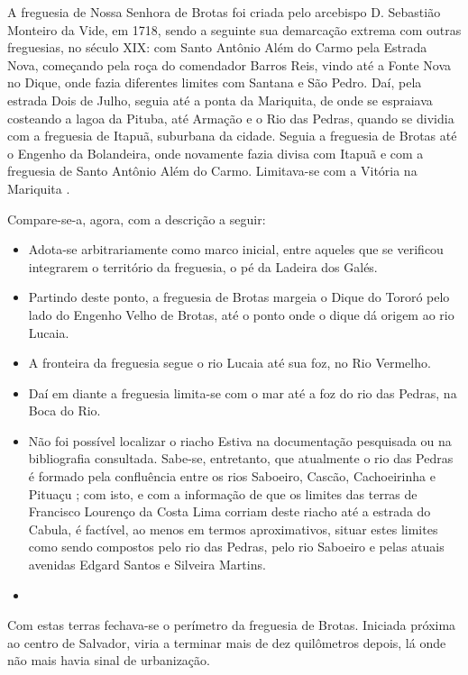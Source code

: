 \begin{citacao}
\begin{citacao}
A freguesia de Nossa Senhora de Brotas foi criada pelo arcebispo D. Sebastião Monteiro da Vide, em 1718, sendo a seguinte sua demarcação extrema com outras freguesias, no século XIX: com Santo Antônio Além do Carmo pela Estrada Nova, começando pela roça do comendador Barros Reis, vindo até a Fonte Nova no Dique, onde fazia diferentes limites com Santana e São Pedro. Daí, pela estrada Dois de Julho, seguia até a ponta da Mariquita, de onde se espraiava costeando a lagoa da Pituba, até Armação e o Rio das Pedras, quando se dividia com a freguesia de Itapuã, suburbana da cidade. Seguia a freguesia de Brotas até o Engenho da Bolandeira, onde novamente fazia divisa com Itapuã e com a freguesia de Santo Antônio Além do Carmo. Limitava-se com a Vitória na Mariquita \cite[p.~58]{NASCIMENTO2007}.
\end{citacao}

Compare-se-a, agora, com a descrição a seguir:

\begin{itemize}
\item Adota-se arbitrariamente como marco inicial, entre aqueles que se verificou integrarem o território da freguesia, o pé da Ladeira dos Galés.
\item Partindo deste ponto, a freguesia de Brotas margeia o Dique do Tororó pelo lado do Engenho Velho de Brotas, até o ponto onde o dique dá origem ao rio Lucaia.
\item A fronteira da freguesia segue o rio Lucaia até sua foz, no Rio Vermelho.
\item Daí em diante a freguesia limita-se com o mar até a foz do rio das Pedras, na Boca do Rio.
\item Não foi possível localizar o riacho Estiva na documentação pesquisada ou na bibliografia consultada. Sabe-se, entretanto, que atualmente o rio das Pedras é formado pela confluência entre os rios Saboeiro, Cascão, Cachoeirinha e Pituaçu \cite[p.~175]{santos_aguas_2010}; com isto, e com a informação de que os limites das terras de Francisco Lourenço da Costa Lima corriam deste riacho até a estrada do Cabula, é factível, ao menos em termos aproximativos, situar estes limites como sendo compostos pelo rio das Pedras, pelo rio Saboeiro e pelas atuais avenidas Edgard Santos e Silveira Martins.
\item 
\end{itemize}



Com estas terras fechava-se o perímetro da freguesia de Brotas. Iniciada próxima ao centro de Salvador, viria a terminar mais de dez quilômetros depois, lá onde não mais havia sinal de urbanização.


\end{citacao}
